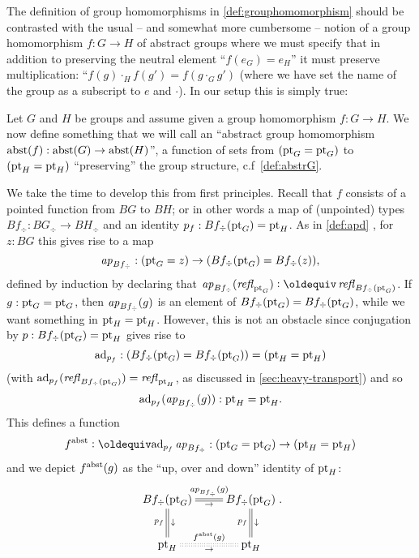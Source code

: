 The definition of group homomorphisms in \cref{def:grouphomomorphism} should be contrasted with the usual -- and somewhat more cumbersome -- notion of a group homomorphism $f\colon G\to H$ of abstract groups where we must specify that in addition to preserving the neutral element ``$f(e_G)=e_H$'' it must preserve multiplication: ``$f(g)\cdot_H f(g')=f(g\cdot_G g')$ (where we have set the name of the group as a subscript to $e$ and $\cdot$).  In our setup this is simply true:

\begin{definition}\label{def:grouphomomaxioms}
Let $G$ and $H$ be groups and assume given a group homomorphism $f:G\to H$.  We now define something that we will call an ``abstract group homomorphism 
${\mathrm{abst}}(f):\mathrm{abst}(G)\to \mathrm{abst}(H)$'', \ie a function of sets from $({\mathord{\mathrm{pt}}}_G={\mathord{\mathrm{pt}}}_G)$ to $({\mathord{\mathrm{pt}}}_H={\mathord{\mathrm{pt}}}_H)$ ``preserving'' the group structure, c.f~\cref{def:abstrG}.   

We take the time to develop this from first principles.
Recall that $f$ consists of a pointed function from $BG$ to $BH$; or in other words a map of (unpointed) types $Bf_\div\colon BG_\div\to BH_\div$ and an identity $p_f: Bf_\div({\mathord{\mathrm{pt}}}_G)={\mathord{\mathrm{pt}}}_H$.  As in \cref{def:apd}%
, for $z:BG$ this gives rise to a map 
$$\mathop{{\it ap}_{Bf_\div}}:({\mathord{\mathrm{pt}}}_G=z)\to (Bf_\div({\mathord{\mathrm{pt}}}_G)=Bf_\div(z)),$$ 
defined by induction by declaring that $\ap{Bf_\div}(\refl{\pt_G})\defequi \refl{Bf_\div(\pt_G)}$.  
If $g:{\mathord{\mathrm{pt}}}_G={\mathord{\mathrm{pt}}}_G$, then $\mathop{{\it ap}_{Bf_\div}}(g)$ is an element of $Bf_\div({\mathord{\mathrm{pt}}}_G)=Bf_\div({\mathord{\mathrm{pt}}}_G)$, while we want something in ${\mathord{\mathrm{pt}}}_H={\mathord{\mathrm{pt}}}_H$.  However, this is not an obstacle since conjugation by $p: Bf_\div({\mathord{\mathrm{pt}}}_G)={\mathord{\mathrm{pt}}}_H$ gives rise to 
$$\mathrm{ad}_{p_f}:(Bf_\div({\mathord{\mathrm{pt}}}_G)=Bf_\div({\mathord{\mathrm{pt}}}_G))=({\mathord{\mathrm{pt}}}_H={\mathord{\mathrm{pt}}}_H)$$ (with $\mathrm{ad}_{p_f}(\mathop{{\it refl}_{Bf_\div({\mathord{\mathrm{pt}}}_G)}})=\mathop{{\it refl}_{{\mathord{\mathrm{pt}}}_H}}$, as discussed in \cref{sec:heavy-transport}) and so 
$$\mathrm{ad}_{p_f}(\mathop{{\it ap}_{Bf_\div}}(g)):{\mathord{\mathrm{pt}}}_H={\mathord{\mathrm{pt}}}_H.$$
This defines a function
$$f^\abstr\defequi \mathrm{ad}_{p_f}\ap{Bf_\div}:(\pt_G=\pt_G)\to(\pt_H=\pt_H)$$  
and we depict $f^{\mathrm{abst}}(g)$ as the ``up, over and down'' identity of ${\mathord{\mathrm{pt}}}_H$:
$$\xymatrix{Bf_\div(\pt_G)\ar@{=}[r]^{\ap{Bf_\div}(g)}_\to\ar@{=}[d]^\downarrow_{p_f}&Bf_\div(\pt_G)\ar@{=}[d]^\downarrow_{p_f}\\
\pt_H\ar@{:}[r]^{f^\abstr(g)}_\to&\pt_H}.$$




\end{definition}
